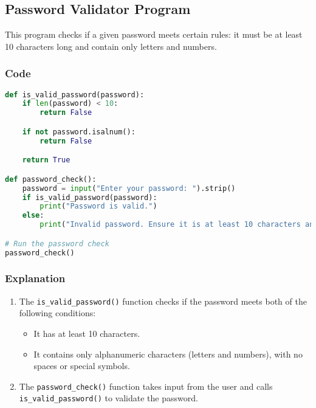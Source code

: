 \documentclass{article}
\begin{document}
\subsection{Password Validator Program}
This program checks if a given password meets certain rules: it must be at least 10 characters long and contain only letters and numbers.
\subsubsection{Code}
\begin{lstlisting}[language=Python ]
def is_valid_password(password):
    if len(password) < 10:
        return False

    if not password.isalnum():
        return False

    return True

def password_check():
    password = input("Enter your password: ").strip()
    if is_valid_password(password):
        print("Password is valid.")
    else:
        print("Invalid password. Ensure it is at least 10 characters and contains only letters and numbers.")

# Run the password check
password_check()
\end{lstlisting}
\subsubsection{Explanation}
\begin{enumerate}
    \item The \texttt{is\_valid\_password()} function checks if the password meets both of the following conditions:
    \begin{itemize}
        \item It has at least 10 characters.
        \item It contains only alphanumeric characters (letters and numbers), with no spaces or special symbols.
    \end{itemize}
    \item The \texttt{password\_check()} function takes input from the user and calls \texttt{is\_valid\_password()} to validate the password.
\end{enumerate}
\end{document}
